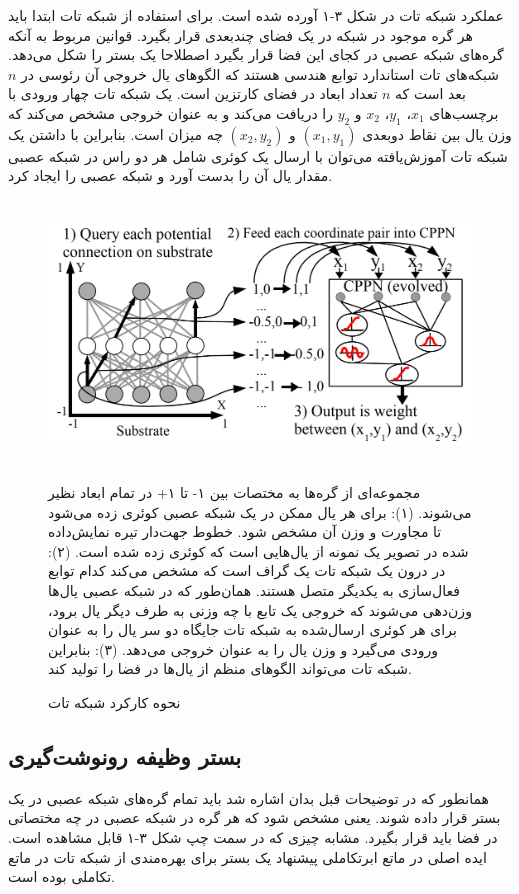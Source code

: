 عملکرد شبکه تات در شکل ۳-۱ آورده شده است. برای استفاده از شبکه تات ابتدا باید هر گره موجود در شبکه در یک فضای چندبعدی قرار بگیرد. قوانین مربوط به آنکه گره‌های شبکه عصبی در کجای این فضا قرار بگیرد اصطلاحا یک بستر را شکل می‌دهد. شبکه‌های تات استاندارد توابع هندسی هستند که الگوهای یال خروجی آن رئوسی در $n$ بعد است که $n$ تعداد ابعاد در فضای کارتزین است. یک شبکه تات چهار ورودی با برچسب‌های $x_1$، $y_1$، $x_2$ و $y_2$ را دریافت می‌کند و به عنوان خروجی مشخص می‌کند که وزن یال بین نقاط دوبعدی $(x_1, y_1)$ و $(x_2, y_2)$ چه میزان است. بنابراین با داشتن یک شبکه تات آموزش‌یافته می‌توان با ارسال یک کوئری شامل هر دو راس در شبکه عصبی مقدار یال آن را بدست آورد و شبکه عصبی را ایجاد کرد.\cite{merrild2018hyperntm}

\begin{figure}[!h]
\begin{center}
\includegraphics[height=7cm]{CPPN.png}
\end{center}
\caption{نحوه کارکرد شبکه تات\cite{merrild2018hyperntm}}
\medskip
\small
مجموعه‌ای از گره‌ها به مختصات بین ۱- تا ۱+ در تمام ابعاد نظیر می‌شوند.
(۱): برای هر یال ممکن در یک شبکه عصبی کوئری زده می‌شود تا مجاورت و وزن آن مشخص شود. خطوط جهت‌دار تیره نمایش‌داده شده در تصویر یک نمونه از یال‌هایی است که کوئری زده شده است.
(۲): در درون یک شبکه تات یک گراف است که مشخص می‌کند کدام توابع فعال‌سازی به یکدیگر متصل هستند. همان‌طور که در شبکه عصبی یال‌ها وزن‌دهی می‌شوند که خروجی یک تابع با چه وزنی به طرف دیگر یال برود، برای هر کوئری ارسال‌شده به شبکه تات جایگاه دو سر یال را به عنوان ورودی می‌گیرد و وزن یال را به عنوان خروجی می‌دهد. (۳): بنابراین شبکه تات می‌تواند الگوهای منظم از یال‌ها در فضا را تولید کند.\cite{merrild2018hyperntm}

\end{figure}

\subsection{بستر وظیفه رونوشت‌گیری}
همانطور که در توضیحات قبل بدان اشاره شد باید تمام گره‌های شبکه عصبی در یک بستر قرار داده شوند. یعنی مشخص شود که هر گره در شبکه عصبی در چه مختصاتی در فضا باید قرار بگیرد. مشابه چیزی که در سمت چپ شکل ۳-۱ قابل مشاهده است. ایده اصلی در ماتع ابرتکاملی پیشنهاد یک بستر برای بهره‌مندی از شبکه تات در ماتع تکاملی بوده است.
\\

